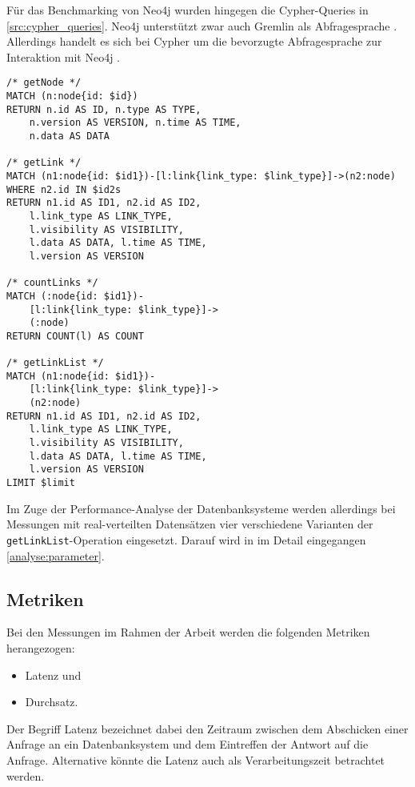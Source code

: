 Für das Benchmarking von Neo4j wurden hingegen die  Cypher-Queries in \autoref{src:cypher_queries}. Neo4j unterstützt zwar auch Gremlin als Abfragesprache \cite{gdbms}. Allerdings handelt es sich bei Cypher um die bevorzugte Abfragesprache zur Interaktion mit Neo4j \cite{gdbms}.

\begin{lstlisting}[label=src:cypher_queries,caption={Cypher Queries (regulär)},language=CQL]
/* getNode */
MATCH (n:node{id: $id}) 
RETURN n.id AS ID, n.type AS TYPE, 
    n.version AS VERSION, n.time AS TIME, 
    n.data AS DATA

/* getLink */
MATCH (n1:node{id: $id1})-[l:link{link_type: $link_type}]->(n2:node) 
WHERE n2.id IN $id2s 
RETURN n1.id AS ID1, n2.id AS ID2, 
    l.link_type AS LINK_TYPE, 
    l.visibility AS VISIBILITY, 
    l.data AS DATA, l.time AS TIME, 
    l.version AS VERSION

/* countLinks */
MATCH (:node{id: $id1})-
    [l:link{link_type: $link_type}]->
    (:node) 
RETURN COUNT(l) AS COUNT

/* getLinkList */
MATCH (n1:node{id: $id1})-
    [l:link{link_type: $link_type}]->
    (n2:node) 
RETURN n1.id AS ID1, n2.id AS ID2, 
    l.link_type AS LINK_TYPE, 
    l.visibility AS VISIBILITY, 
    l.data AS DATA, l.time AS TIME, 
    l.version AS VERSION 
LIMIT $limit
\end{lstlisting}

Im Zuge der Performance-Analyse der Datenbanksysteme werden allerdings bei Messungen mit real-verteilten Datensätzen vier verschiedene Varianten der \texttt{getLinkList}-Operation eingesetzt. Darauf wird in im Detail eingegangen \autoref{analyse:parameter}.

\subsection{Metriken}
Bei den Messungen im Rahmen der Arbeit werden die folgenden Metriken herangezogen: 

\begin{itemize}
    \item Latenz und 
    \item Durchsatz.
\end{itemize}

Der Begriff Latenz bezeichnet dabei den Zeitraum zwischen dem Abschicken einer Anfrage an ein Datenbanksystem und dem Eintreffen der Antwort auf die Anfrage. Alternative könnte die Latenz auch als Verarbeitungszeit betrachtet werden. 

